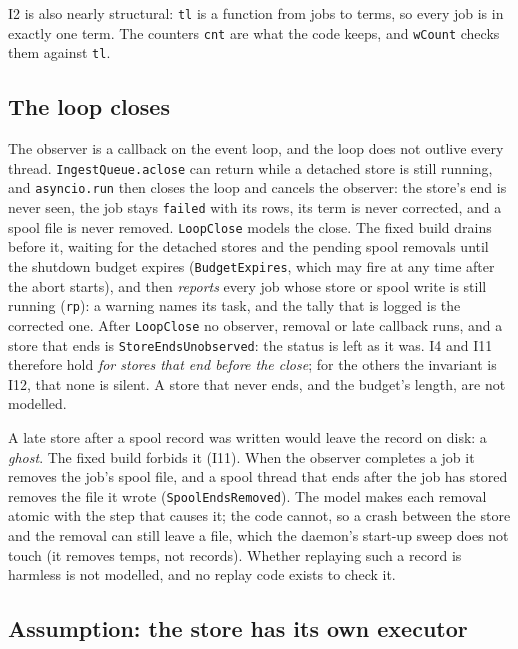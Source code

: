\documentclass[a4paper,10pt,fleqn]{article}
\newcommand{\field}[1]{\texttt{#1}}
\begin{document}
I2 is also nearly structural: \field{tl} is a function from jobs to terms, so
every job is in exactly one term. The counters \field{cnt} are what the code
keeps, and \field{wCount} checks them against \field{tl}.

\subsection{The loop closes}

The observer is a callback on the event loop, and the loop does not outlive every
thread. \field{IngestQueue.aclose} can return while a detached store is still
running, and \field{asyncio.run} then closes the loop and cancels the observer: the
store's end is never seen, the job stays \field{failed} with its rows, its term is
never corrected, and a spool file is never removed. \field{LoopClose} models the
close. The fixed build drains before it, waiting for the detached stores and the
pending spool removals until the shutdown budget expires (\field{BudgetExpires},
which may fire at any time after the abort starts), and then \emph{reports} every
job whose store or spool write is still running (\field{rp}): a warning names its
task, and the tally that is logged is the corrected one. After \field{LoopClose}
no observer, removal or late callback runs, and a store that ends is
\field{StoreEndsUnobserved}: the status is left as it was. I4 and I11 therefore
hold \emph{for stores that end before the close}; for the others the invariant is
I12, that none is silent. A store that never ends, and the budget's length, are not
modelled.

A late store after a spool record was written would leave the record on disk: a
\emph{ghost}. The fixed build forbids it (I11). When the observer completes a
job it removes the job's spool file, and a spool thread that ends after the job
has stored removes the file it wrote (\field{SpoolEndsRemoved}). The model makes
each removal atomic with the step that causes it; the code cannot, so a crash
between the store and the removal can still leave a file, which the daemon's
start-up sweep does not touch (it removes temps, not records). Whether replaying
such a record is harmless is not modelled, and no replay code exists to check it.

\subsection{Assumption: the store has its own executor}
\end{document}
